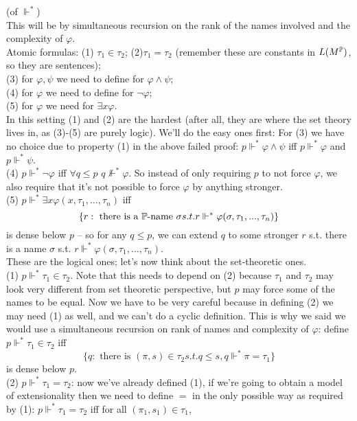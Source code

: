 \documentclass[a4paper]{article}
\begin{document}
\begin{defi} (of $\Vdash^*$)\\
This will be by simultaneous recursion on the rank of the names involved and the complexity of $\varphi$.\\
Atomic formulas: (1) $\tau_1 \in \tau_2$; (2)$\tau_1 = \tau_2$ (remember these are constants in $L(M^\P)$, so they are sentences);\\
(3) for $\varphi,\psi$ we need to define for $\varphi \wedge \psi$;\\
(4) for $\varphi$ we need to define for $\neg \varphi$;\\
(5) for $\varphi$ we need for $\exists x \varphi$.\\
In this setting (1) and (2) are the hardest (after all, they are where the set theory lives in, as (3)-(5) are purely logic). We'll do the easy ones first:
For (3) we have no choice due to property (1) in the above failed proof: $p \Vdash^* \varphi \wedge \psi$ iff $p \Vdash^* \varphi$ and $p \Vdash^* \psi$.\\
(4) $p \Vdash^* \neg \varphi$ iff $\forall q \leq p$ $q \not\Vdash^* \varphi$. So instead of only requiring $p$ to not force $\varphi$, we also require that it's not possible to force $\varphi$ by anything stronger.\\
(5) $p \Vdash^* \exists x \varphi(x,\tau_1,...,\tau_n)$ iff 
\[
\{r: \text{ there is a } \P \text{-name }\sigma s.t. r \Vdash^*\varphi(\sigma,\tau_1,...,\tau_n)\}
\]
is dense below $p$ -- so for any $q \leq p$, we can extend $q$ to some stronger $r$ s.t. there is a name $\sigma$ s.t. $r \Vdash^* \varphi(\sigma,\tau_1,...,\tau_n)$.\\
These are the logical ones; let's now think about the set-theoretic ones.\\
(1) $p \Vdash^* \tau_1 \in \tau_2$. Note that this needs to depend on (2) because $\tau_1$ and $\tau_2$ may look very different from set theoretic perspective, but $p$ may force some of the names to be equal. Now we have to be very careful because in defining (2) we may need (1) as well, and we can't do a cyclic definition. This is why we said we would use a simultaneous recursion on rank of names and complexity of $\varphi$: define $p \Vdash^* \tau_1 \in \tau_2$ iff 
\[
\{q:\text{ there is }(\pi,s) \in \tau_2 s.t. q \leq s,q \Vdash^* \pi = \tau_1\}
\]
is dense below $p$.\\
(2) $p \Vdash^* \tau_1 =\tau_2$: now we've already defined (1), if we're going to obtain a model of extensionality then we need to define $=$ in the only possible way as required by (1): $p \Vdash^* \tau_1 = \tau_2$ iff for all $(\pi_1,s_1) \in \tau_1$,

\end{defi}
\end{document}
